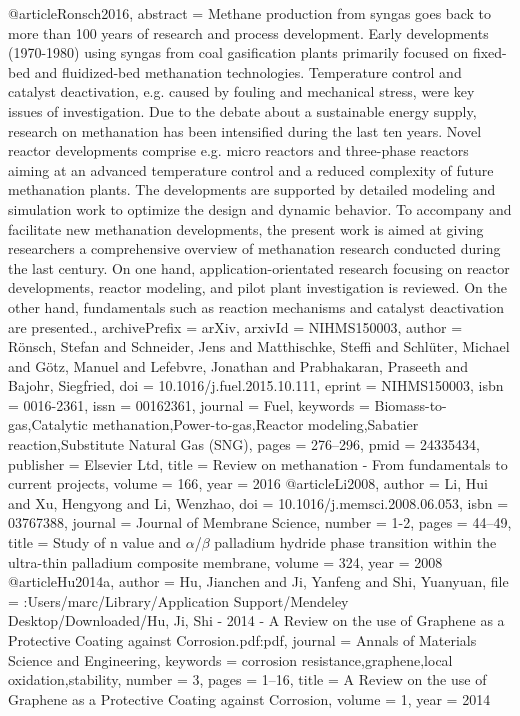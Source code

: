 @article{Ronsch2016,
abstract = {Methane production from syngas goes back to more than 100 years of research and process development. Early developments (1970-1980) using syngas from coal gasification plants primarily focused on fixed-bed and fluidized-bed methanation technologies. Temperature control and catalyst deactivation, e.g. caused by fouling and mechanical stress, were key issues of investigation. Due to the debate about a sustainable energy supply, research on methanation has been intensified during the last ten years. Novel reactor developments comprise e.g. micro reactors and three-phase reactors aiming at an advanced temperature control and a reduced complexity of future methanation plants. The developments are supported by detailed modeling and simulation work to optimize the design and dynamic behavior. To accompany and facilitate new methanation developments, the present work is aimed at giving researchers a comprehensive overview of methanation research conducted during the last century. On one hand, application-orientated research focusing on reactor developments, reactor modeling, and pilot plant investigation is reviewed. On the other hand, fundamentals such as reaction mechanisms and catalyst deactivation are presented.},
archivePrefix = {arXiv},
arxivId = {NIHMS150003},
author = {R{\"{o}}nsch, Stefan and Schneider, Jens and Matthischke, Steffi and Schl{\"{u}}ter, Michael and G{\"{o}}tz, Manuel and Lefebvre, Jonathan and Prabhakaran, Praseeth and Bajohr, Siegfried},
doi = {10.1016/j.fuel.2015.10.111},
eprint = {NIHMS150003},
isbn = {0016-2361},
issn = {00162361},
journal = {Fuel},
keywords = {Biomass-to-gas,Catalytic methanation,Power-to-gas,Reactor modeling,Sabatier reaction,Substitute Natural Gas (SNG)},
pages = {276--296},
pmid = {24335434},
publisher = {Elsevier Ltd},
title = {{Review on methanation - From fundamentals to current projects}},
volume = {166},
year = {2016}
}
@article{Li2008,
author = {Li, Hui and Xu, Hengyong and Li, Wenzhao},
doi = {10.1016/j.memsci.2008.06.053},
isbn = {03767388},
journal = {Journal of Membrane Science},
number = {1-2},
pages = {44--49},
title = {{Study of n value and $\alpha$/$\beta$ palladium hydride phase transition within the ultra-thin palladium composite membrane}},
volume = {324},
year = {2008}
}
@article{Hu2014a,
author = {Hu, Jianchen and Ji, Yanfeng and Shi, Yuanyuan},
file = {:Users/marc/Library/Application Support/Mendeley Desktop/Downloaded/Hu, Ji, Shi - 2014 - A Review on the use of Graphene as a Protective Coating against Corrosion.pdf:pdf},
journal = {Annals of Materials Science and Engineering},
keywords = {corrosion resistance,graphene,local oxidation,stability},
number = {3},
pages = {1--16},
title = {{A Review on the use of Graphene as a Protective Coating against Corrosion}},
volume = {1},
year = {2014}
}
